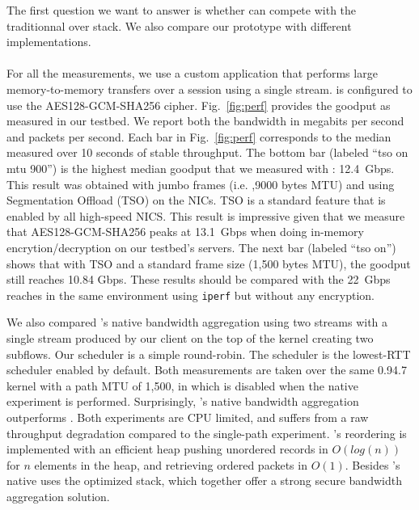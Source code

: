 The first question we want to answer is whether \tcpls can compete with the
traditionnal \tls over \tcp stack. We also compare our \tcpls prototype with
different \quic implementations.

\paragraph*{\tcpls}
For all the \tcpls measurements, we use a custom application that performs
large memory-to-memory transfers over a \tcpls session using a single stream.
\tcpls is configured to use the AES128-GCM-SHA256 cipher. Fig.~\ref{fig:perf} provides the goodput as measured in our testbed. We report both the bandwidth in megabits per second and packets per second. Each bar in Fig.~\ref{fig:perf} corresponds to the median measured over 10 seconds of stable throughput. The bottom bar (labeled ``\tcpls tso on mtu 900'') is the highest median goodput that we measured with \tcpls: 12.4~Gbps. This result was obtained with jumbo frames (i.e. ,9000 bytes MTU) and using \tcp Segmentation Offload (TSO) on the NICs. TSO is a standard feature that is enabled by all high-speed NICS. This result is impressive given that we measure that AES128-GCM-SHA256 peaks at 13.1~Gbps when doing in-memory encrytion/decryption on our testbed's servers.
The next bar (labeled ``\tcpls tso on'') shows that with TSO and a standard frame size (1,500 bytes MTU), the goodput still reaches 10.84 Gbps. These
results should be compared with the 22~Gbps \tcp reaches in the same
environment using \texttt{iperf} but without any encryption.


We also compared \tcpls's native bandwidth aggregation using two streams with a
single stream produced by our \tcpls client on the top of the \mptcp kernel
creating two \mptcp subflows. Our \tcpls scheduler is a simple round-robin. The
\mptcp scheduler is the lowest-RTT scheduler enabled by default. Both
measurements are taken over the same 0.94.7 \mptcp kernel with a path MTU of
1,500, in which \mptcp is disabled when the \tcpls native experiment is
performed.  Surprisingly, \tcpls's native bandwidth aggregation outperforms
\mptcp. Both experiments are CPU limited, and suffers from a raw throughput
degradation compared to the single-path experiment. \tcpls's reordering is
implemented with an efficient heap pushing unordered records in $O(log(n))$ for
$n$ elements in the heap, and retrieving ordered packets in $O(1)$. Besides
\tcpls's native uses the \tcp optimized stack, which together offer a strong
secure bandwidth aggregation solution.

